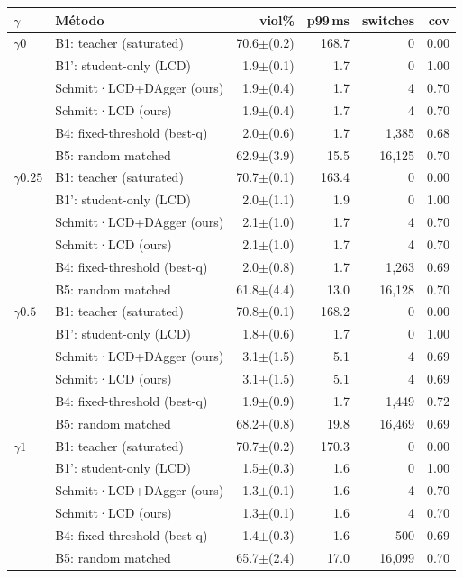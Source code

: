 \begin{tabular}{llrrrr}
\toprule
$\gamma$ & Método & viol\% & p99\,ms & switches & cov \\
\midrule
$\gamma0$ & B1: teacher (saturated) & 70.6$\pm$(0.2) & 168.7 & 0 & 0.00 \\
 & B1': student-only (LCD) & 1.9$\pm$(0.1) & 1.7 & 0 & 1.00 \\
 & Schmitt·LCD+DAgger (ours) & 1.9$\pm$(0.4) & 1.7 & 4 & 0.70 \\
 & Schmitt·LCD (ours) & 1.9$\pm$(0.4) & 1.7 & 4 & 0.70 \\
 & B4: fixed-threshold (best-q) & 2.0$\pm$(0.6) & 1.7 & 1,385 & 0.68 \\
 & B5: random matched & 62.9$\pm$(3.9) & 15.5 & 16,125 & 0.70 \\
\addlinespace
$\gamma0.25$ & B1: teacher (saturated) & 70.7$\pm$(0.1) & 163.4 & 0 & 0.00 \\
 & B1': student-only (LCD) & 2.0$\pm$(1.1) & 1.9 & 0 & 1.00 \\
 & Schmitt·LCD+DAgger (ours) & 2.1$\pm$(1.0) & 1.7 & 4 & 0.70 \\
 & Schmitt·LCD (ours) & 2.1$\pm$(1.0) & 1.7 & 4 & 0.70 \\
 & B4: fixed-threshold (best-q) & 2.0$\pm$(0.8) & 1.7 & 1,263 & 0.69 \\
 & B5: random matched & 61.8$\pm$(4.4) & 13.0 & 16,128 & 0.70 \\
\addlinespace
$\gamma0.5$ & B1: teacher (saturated) & 70.8$\pm$(0.1) & 168.2 & 0 & 0.00 \\
 & B1': student-only (LCD) & 1.8$\pm$(0.6) & 1.7 & 0 & 1.00 \\
 & Schmitt·LCD+DAgger (ours) & 3.1$\pm$(1.5) & 5.1 & 4 & 0.69 \\
 & Schmitt·LCD (ours) & 3.1$\pm$(1.5) & 5.1 & 4 & 0.69 \\
 & B4: fixed-threshold (best-q) & 1.9$\pm$(0.9) & 1.7 & 1,449 & 0.72 \\
 & B5: random matched & 68.2$\pm$(0.8) & 19.8 & 16,469 & 0.69 \\
\addlinespace
$\gamma1$ & B1: teacher (saturated) & 70.7$\pm$(0.2) & 170.3 & 0 & 0.00 \\
 & B1': student-only (LCD) & 1.5$\pm$(0.3) & 1.6 & 0 & 1.00 \\
 & Schmitt·LCD+DAgger (ours) & 1.3$\pm$(0.1) & 1.6 & 4 & 0.70 \\
 & Schmitt·LCD (ours) & 1.3$\pm$(0.1) & 1.6 & 4 & 0.70 \\
 & B4: fixed-threshold (best-q) & 1.4$\pm$(0.3) & 1.6 & 500 & 0.69 \\
 & B5: random matched & 65.7$\pm$(2.4) & 17.0 & 16,099 & 0.70 \\
\bottomrule
\end{tabular}

